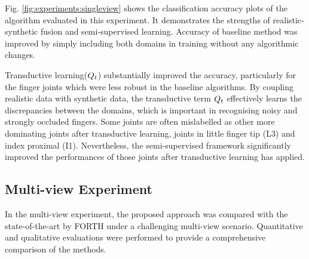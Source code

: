 Fig. \ref{fig:experiments:singleview} shows the classification accuracy plots of the algorithm evaluated in this experiment.  
It demonstrates the strengths of realistic-synthetic fusion and semi-supervised learning. 
Accuracy of baseline method was improved by simply including both domains in training without any algorithmic changes. 

Transductive learning($Q_{t}$) substantially improved the accuracy, particularly for the finger joints which were less robust in the baseline algorithms.  
By coupling realistic data with synthetic data, the transductive term $Q_{t}$ effectively learns the discrepancies between the domains, which is important in recognising noisy and strongly occluded fingers.
Some joints are often mislabelled as other more dominating joints after transductive learning, \eg joints in little finger tip (L3) and index proximal (I1). Nevertheless, the semi-supervised framework significantly improved the performances of those joints after transductive learning has applied.  

\begin{figure*}[ht]
	\centering
	\caption{Joint classification accuracy of the single view sequence.}
	\label{fig:experiments:singleview}
\end{figure*}


\subsection{Multi-view Experiment}  

In the multi-view experiment, the proposed approach was compared with the state-of-the-art by FORTH\cite{Oikonomidis_ICCV_11} under a challenging multi-view scenario. Quantitative and qualitative evaluations were performed to provide a comprehensive comparison of the methods. 

